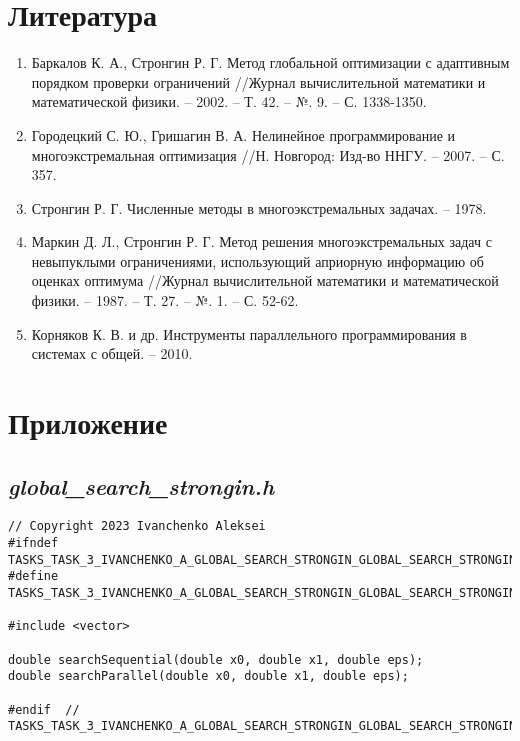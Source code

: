 \documentclass{article}
\begin{document}
\section*{Литература}
\begin{enumerate}
\item Баркалов К. А., Стронгин Р. Г. Метод глобальной оптимизации с адаптивным порядком проверки ограничений //Журнал вычислительной математики и математической физики. – 2002. – Т. 42. – №. 9. – С. 1338-1350.
\item Городецкий С. Ю., Гришагин В. А. Нелинейное программирование и многоэкстремальная оптимизация //Н. Новгород: Изд-во ННГУ. – 2007. – С. 357.
\item Стронгин Р. Г. Численные методы в многоэкстремальных задачах. – 1978.
\item Маркин Д. Л., Стронгин Р. Г. Метод решения многоэкстремальных задач с невыпуклыми ограничениями, использующий априорную информацию об оценках оптимума //Журнал вычислительной математики и математической физики. – 1987. – Т. 27. – №. 1. – С. 52-62.
\item Корняков К. В. и др. Инструменты параллельного программирования в системах с общей. – 2010.
\end{enumerate}

\section*{Приложение}
\subsection*{\emph{global\_search\_strongin.h}}
\begin{lstlisting}
// Copyright 2023 Ivanchenko Aleksei
#ifndef TASKS_TASK_3_IVANCHENKO_A_GLOBAL_SEARCH_STRONGIN_GLOBAL_SEARCH_STRONGIN_H_
#define TASKS_TASK_3_IVANCHENKO_A_GLOBAL_SEARCH_STRONGIN_GLOBAL_SEARCH_STRONGIN_H_

#include <vector>

double searchSequential(double x0, double x1, double eps);
double searchParallel(double x0, double x1, double eps);

#endif  // TASKS_TASK_3_IVANCHENKO_A_GLOBAL_SEARCH_STRONGIN_GLOBAL_SEARCH_STRONGIN_H_
\end{lstlisting}
\end{document}
